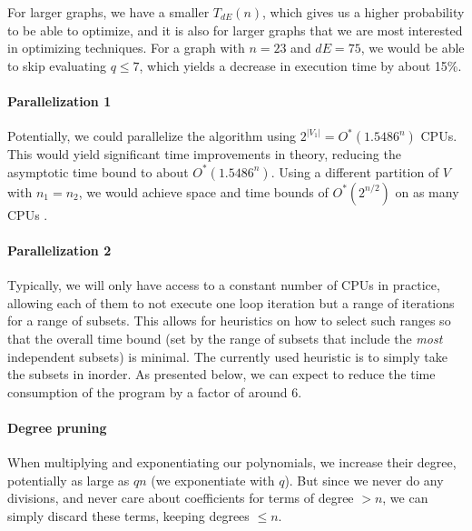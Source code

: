 \documentclass[a4paper]{article}
\begin{document}
\begin{center}
\end{center}
For larger graphs, we have a smaller $T_{dE}(n)$, which gives us a higher probability to be able to optimize, and it is also for larger graphs that we are most interested in optimizing techniques. For a graph with $n=23$ and $dE = 75$, we would be able to skip evaluating $q\leq7$, which yields a decrease in execution time by about 15\%\footnotemark.


\paragraph{Parallelization 1} Potentially, we could parallelize the algorithm using $2^{|V_1|} = O^*(1.5486^n)$ CPUs. This would yield significant time improvements in theory, reducing the asymptotic time bound to about $O^*(1.5486^n)$. Using a different partition of $V$ with $n_1 = n_2$, we would achieve space and time bounds of $O^*(2^{n/2})$ on as many CPUs \cite{cov_pack}.

\paragraph{Parallelization 2} Typically, we will only have access to a constant number of CPUs in practice, allowing each of them to not execute one loop iteration but a range of iterations for a range of subsets. This allows for heuristics on how to select such ranges so that the overall time bound (set by the range of subsets that include the \emph{most} independent subsets) is minimal. The currently used heuristic is to simply take the subsets in inorder. As presented below, we can expect to reduce the time consumption of the program by a factor of around 6.

\paragraph{Degree pruning} When multiplying and exponentiating our polynomials, we increase their degree, potentially as large as $qn$ (we exponentiate with $q$). But since we never do any divisions, and never care about coefficients for terms of degree $> n$, we can simply discard these terms, keeping degrees $\leq n$.
\end{document}
